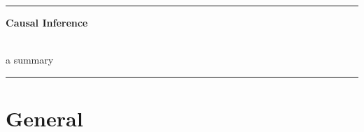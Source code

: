 \documentclass[8pt]{extarticle}
\begin{document}
\vspace*{18em}

\hrule
\begin{center}
{\fontsize{30}{60}\selectfont \textbf{Causal Inference}} \\ \

{\fontsize{20}{60}\selectfont a summary}
\end{center}
\hrule

\tableofcontents




\raggedright %
\setlength{\parindent}{15pt} %
\setlength{\columnseprule}{0.3pt} %









\section{General}
\end{document}
